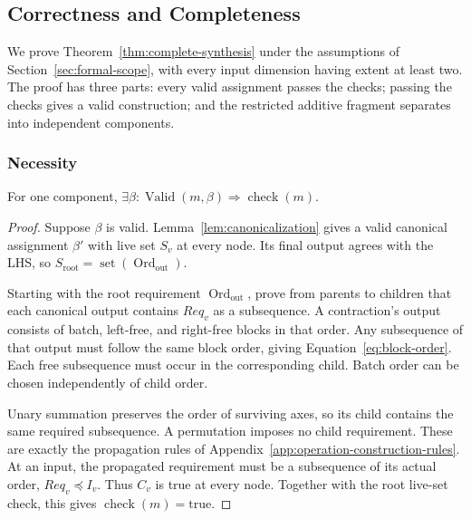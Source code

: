 \subsection{Correctness and Completeness}
\label{app:completeness-proof}
We prove Theorem~\ref{thm:complete-synthesis} under the assumptions of
Section~\ref{sec:formal-scope}, with every input dimension having extent
at least two. The proof has three parts: every valid
assignment passes the checks; passing the checks gives a valid construction;
and the restricted additive fragment separates into independent components.

\subsubsection{Necessity}
\begin{lemma}[Necessity]
\label{lem:necessity}
For one component,
$\exists\beta:\operatorname{Valid}(m,\beta)\Rightarrow\operatorname{check}(m)$.
\end{lemma}
\begin{proof}
Suppose $\beta$ is valid. Lemma~\ref{lem:canonicalization} gives a valid
canonical assignment $\beta'$ with live set $S_v$ at every node. Its final
output agrees with the LHS, so
$S_{\mathrm{root}}=\operatorname{set}(\operatorname{Ord}_{\mathrm{out}})$.

Starting with the root requirement $\operatorname{Ord}_{\mathrm{out}}$, prove from parents to children that
each canonical output contains $Req_v$ as a subsequence. A contraction's
output consists of batch, left-free, and right-free blocks in that order.
Any subsequence of that output must follow the same block order, giving
Equation~\eqref{eq:block-order}. Each free subsequence must occur in the
corresponding child. Batch order can be chosen independently of child order.

Unary summation preserves the order of surviving axes, so its child contains
the same required subsequence. A permutation imposes no child requirement.
These are exactly the propagation rules of
Appendix~\ref{app:operation-construction-rules}. At an input, the propagated
requirement must be a subsequence of its actual order, $Req_v\preceq I_v$.
Thus $C_v$ is true at every node. Together with the root live-set check,
this gives $\operatorname{check}(m)=\mathrm{true}$.
\end{proof}


